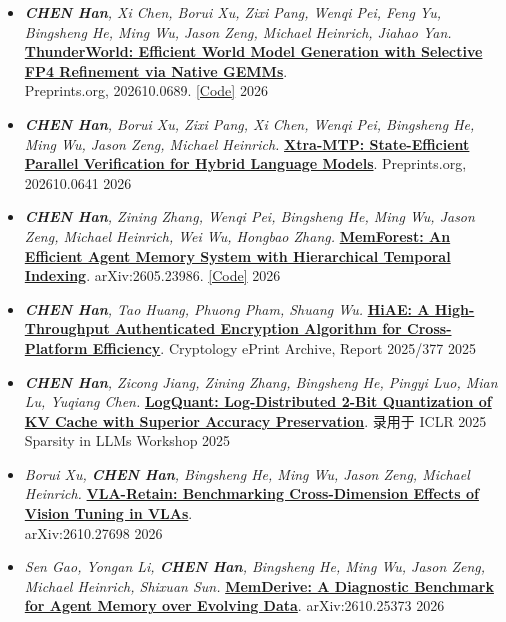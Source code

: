 \documentclass[10pt]{article}
\renewcommand{\section}[2]%
        {\pagebreak[2]\vspace{1\baselineskip}%
         \phantomsection\addcontentsline{toc}{section}{#1}%
         \hspace{0in}%
         \marginpar{
         \raggedright \scshape #1}#2}
\newenvironment{outerlist}[1][\enskip\textbullet]%
        {%
        \begin{itemize}[label=#1, itemsep=1pt]}{\end{itemize}%
         \vspace{-0.6\baselineskip}}
\begin{document}
\section{预印本和发表论文}
\vspace{-0.5in}
\begin{outerlist}
        \item \textit{\textbf{CHEN Han}, Xi Chen, Borui Xu, Zixi Pang, Wenqi Pei, Feng Yu, Bingsheng He, Ming Wu, Jason Zeng, Michael Heinrich, Jiahao Yan.} \href{https://www.preprints.org/manuscript/202610.0689}{\textbf{ThunderWorld: Efficient World Model Generation with Selective FP4 Refinement via Native GEMMs}}.\\
        Preprints.org, 202610.0689. \space \href{https://github.com/Concyclics/ThunderWorld}{[Code]} \hfill 2026
        \item \textit{\textbf{CHEN Han}, Borui Xu, Zixi Pang, Xi Chen, Wenqi Pei, Bingsheng He, Ming Wu, Jason Zeng, Michael Heinrich.} \href{https://www.preprints.org/manuscript/202610.0641}{\textbf{Xtra-MTP: State-Efficient Parallel Verification for Hybrid Language Models}}. Preprints.org, 202610.0641 \hfill 2026
        \item \textit{\textbf{CHEN Han}, Zining Zhang, Wenqi Pei, Bingsheng He, Ming Wu, Jason Zeng, Michael Heinrich, Wei Wu, Hongbao Zhang.} \href{https://arxiv.org/abs/2605.23986}{\textbf{MemForest: An Efficient Agent Memory System with Hierarchical Temporal Indexing}}. arXiv:2605.23986. \space \href{https://github.com/Concyclics/MemForest}{[Code]} \hfill 2026
        \item \textit{\textbf{CHEN Han}, Tao Huang, Phuong Pham, Shuang Wu.} \href{https://eprint.iacr.org/2025/377}{\textbf{HiAE: A High-Throughput Authenticated Encryption Algorithm for Cross-Platform Efficiency}}. Cryptology ePrint Archive, Report 2025/377 \hfill 2025
        \item \textit{\textbf{CHEN Han}, Zicong Jiang, Zining Zhang, Bingsheng He, Pingyi Luo, Mian Lu, Yuqiang Chen.} \href{https://arxiv.org/abs/2503.19950}{\textbf{LogQuant: Log-Distributed 2-Bit Quantization of KV Cache with Superior Accuracy Preservation}}. 录用于 ICLR 2025 Sparsity in LLMs Workshop \hfill 2025
        \item \textit{Borui Xu, \textbf{CHEN Han}, Bingsheng He, Ming Wu, Jason Zeng, Michael Heinrich.} \href{https://arxiv.org/abs/2610.27698}{\textbf{VLA-Retain: Benchmarking Cross-Dimension Effects of Vision Tuning in VLAs}}.\\
        arXiv:2610.27698 \hfill 2026
        \item \textit{Sen Gao, Yongan Li, \textbf{CHEN Han}, Bingsheng He, Ming Wu, Jason Zeng, Michael Heinrich, Shixuan Sun.} \href{https://arxiv.org/abs/2610.25373}{\textbf{MemDerive: A Diagnostic Benchmark for Agent Memory over Evolving Data}}. arXiv:2610.25373 \hfill 2026

\end{outerlist}
\end{document}
